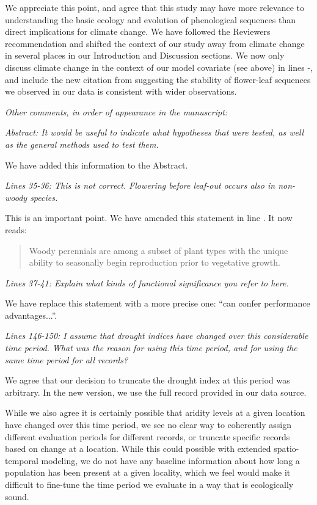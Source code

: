 \documentclass{article}[12pt]
\begin{document}
We appreciate this point, and agree that this study may have more relevance to understanding the basic ecology and evolution of phenological sequences than direct implications for climate change. We have followed the Reviewers recommendation and shifted the context of our study away from climate change in several places in our Introduction and Discussion sections. We now only discuss climate change in the context of our model covariate (see above) in lines -, and include the new citation from \citet{Guo:2023wb} suggesting the stability of flower-leaf sequences we observed in our data is consistent with wider observations.

\emph{Other comments, in order of appearance in the manuscript:}

\emph{Abstract: It would be useful to indicate what hypotheses that were tested, as well as the general methods used to test them.}

We have added this information to the Abstract.

\emph{Lines 35-36: This is not correct. Flowering before leaf-out occurs also in non-woody species.}

This is an important point. We have amended this statement in line . It now reads:
\begin{quote} Woody perennials are among a subset of plant types with the unique ability to seasonally begin reproduction prior to vegetative growth.\end{quote}

\emph{Lines 37-41: Explain what kinds of functional significance you refer to here.}

We have replace this statement with a more precise one: ``can confer performance advantages...''.

\emph{Lines 146-150: I assume that drought indices have changed over this considerable time period. What was the reason for using this time period, and for using the same time period for all records?}

We agree that our decision to truncate the drought index at this period was arbitrary. In the new version, we use the full record provided in our data source.

While we also agree it is certainly possible that aridity levels at a given location have changed over this time period, we see no clear way to coherently assign different evaluation periods for different records, or truncate specific records based on change at a location. While this could possible with extended spatio-temporal modeling, we do not have any baseline information about how long a population has been present at a given locality, which we feel would make it difficult to fine-tune the time period we evaluate in a way that is ecologically sound. %
\end{document}
